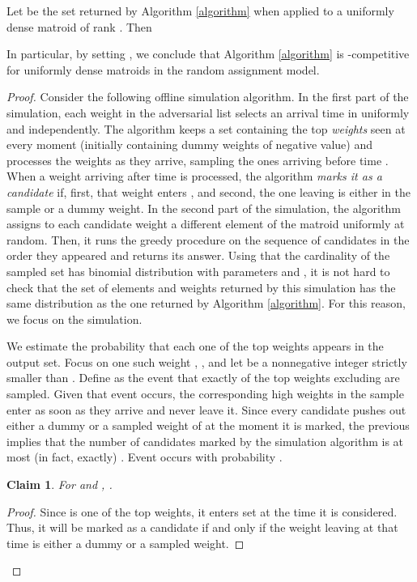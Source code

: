 \documentclass[letterpaper,11pt]{article}
\newtheorem{Claim}{Claim}
\theoremstyle{definition}
\theoremstyle{remark}
\begin{document}
\begin{thm}\label{thm:algorithm1}
Let  be the set returned by Algorithm \ref{algorithm} when applied to a uniformly dense matroid  of rank . Then

In particular, by setting , we conclude that Algorithm \ref{algorithm} is -competitive for uniformly dense matroids in the random assignment model.
\end{thm}
\begin{proof}

Consider the following offline simulation algorithm. In the first part of the simulation, each weight  in the adversarial list  selects an arrival time  in  uniformly and independently. The algorithm keeps a set  containing the top  \emph{weights} seen at every moment (initially containing  dummy weights of negative value) and processes the weights as they arrive, sampling the ones arriving before time . When a weight arriving after time  is processed, the algorithm \emph{marks it as a candidate} if, first, that weight enters , and second, the one leaving  is either in the sample or a dummy weight.
In the second part of the simulation, the algorithm assigns to each candidate weight a different element of the matroid uniformly at random. Then, it runs the greedy procedure on the sequence of candidates in the order they appeared and returns its answer. Using that the cardinality of the sampled set has binomial distribution with parameters  and , it is not hard to check that the set of elements and weights returned by this simulation has the same distribution as the one returned by Algorithm \ref{algorithm}. For this reason, we focus on the simulation.

We estimate the probability that each one of the top  weights appears in the output set. Focus on one such weight , , and let  be a nonnegative integer strictly smaller than . Define  as the event that exactly  of the top  weights excluding  are sampled.  Given that event  occurs, the corresponding  high weights in the sample enter  as soon as they arrive and never leave it. Since every candidate pushes out either a dummy or a sampled weight of  at the moment it is marked, the previous implies that the number of candidates marked by the simulation algorithm is at most (in fact, exactly) . Event  occurs with probability .


\begin{Claim} For  and ,
.
\end{Claim}

\begin{proof}
  Since  is one of the top  weights, it enters set  at the time it is considered. Thus, it will be marked as a candidate if and only if the weight leaving  at that time is either a dummy or a sampled weight.


\end{proof}
\end{proof}
\end{document}
